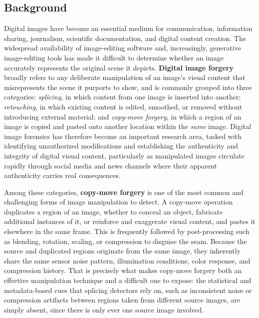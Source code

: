 \documentclass[conference]{IEEEtran}
\begin{document}
\subsection{Background}
Digital images have become an essential medium for communication, information sharing, journalism, scientific documentation, and digital content creation. The widespread availability of image-editing software and, increasingly, generative image-editing tools has made it difficult to determine whether an image accurately represents the original scene it depicts. \textbf{Digital image forgery} broadly refers to any deliberate manipulation of an image's visual content that misrepresents the scene it purports to show, and is commonly grouped into three categories: \emph{splicing}, in which content from one image is inserted into another; \emph{retouching}, in which existing content is edited, smoothed, or removed without introducing external material; and \emph{copy-move forgery}, in which a region of an image is copied and pasted onto another location within the \emph{same} image. Digital image forensics has therefore become an important research area, tasked with identifying unauthorized modifications and establishing the authenticity and integrity of digital visual content, particularly as manipulated images circulate rapidly through social media and news channels where their apparent authenticity carries real consequences.

Among these categories, \textbf{copy-move forgery} is one of the most common and challenging forms of image manipulation to detect. A copy-move operation duplicates a region of an image, whether to conceal an object, fabricate additional instances of it, or reinforce and exaggerate visual content, and pastes it elsewhere in the same frame. This is frequently followed by post-processing such as blending, rotation, scaling, or compression to disguise the seam. Because the source and duplicated regions originate from the same image, they inherently share the same sensor noise pattern, illumination conditions, color response, and compression history. That is precisely what makes copy-move forgery both an effective manipulation technique and a difficult one to expose: the statistical and metadata-based cues that splicing detectors rely on, such as inconsistent noise or compression artifacts between regions taken from different source images, are simply absent, since there is only ever one source image involved.
\end{document}
